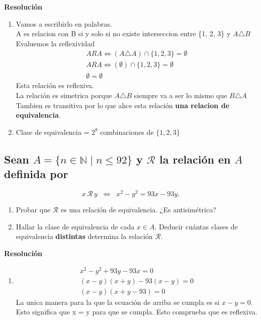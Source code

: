 \documentclass[11pt]{article}
\begin{document}
\textbf{Resolución}

\begin{enumerate}[label=\roman*)]
    \item Vamos a escribirlo en palabras. \\
    A es relacion con B si y solo si no existe interseccion entre \{1, 2, 3\} y $A \triangle B$ \\
    Evaluemos la reflexividad
    \begin{align*}
        A R A \Leftrightarrow (A \triangle A) \cap \{1,2,3\} = \emptyset \\
        A R A \Leftrightarrow (\emptyset) \cap \{1,2,3\} = \emptyset \\
        \emptyset = \emptyset 
    \end{align*}
    Esta relación es reflexiva. \\
    La relación es simetrica porque $A \triangle B$ siempre va a ser lo mismo que $ B \triangle A$ \\
    Tambien es transitiva por lo que ahce esta relación \textbf{una relacion de equivalencia}.
    \item Clase de equivalencia = $2^{8}$ combinaciones de $\{1,2,3\}$
\end{enumerate}

\subsection{Sean $A = \{ n \in \mathbb{N} \mid n \leq 92 \}$ y $\mathcal{R}$ la relación en $A$ definida por}
\[
x \,\mathcal{R}\, y \;\;\Longleftrightarrow\;\; x^{2} - y^{2} = 93x - 93y.
\]

\begin{enumerate}[label=\roman*)]
    \item Probar que $\mathcal{R}$ es una relación de equivalencia. ¿Es antisimétrica?
    \item Hallar la clase de equivalencia de cada $x \in A$. Deducir cuántas clases de equivalencia \textbf{distintas} determina la relación $\mathcal{R}$.
\end{enumerate}

\textbf{Resolución}

\begin{enumerate}[label=\roman*)]
    \item \begin{align*}
        x^{2} - y^{2} + 93y - 93x = 0 \\
        (x - y) (x + y) - 93 (x - y) = 0 \\
        (x - y) (x + y - 93) = 0
    \end{align*}
    La unica manera para la que la ecuación de arriba se cumpla es si $ x - y = 0$. \\
    Esto significa que x = y para que se cumpla. Esto comprueba que es reflexiva. 
\end{enumerate}
\end{document}
